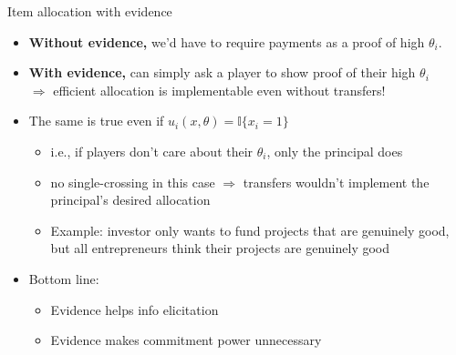 \documentclass[english,10pt
,aspectratio=169
]{beamer}
\begin{document}
\begin{frame}{Item allocation with evidence}
\begin{itemize}
	\item \textbf{Without evidence,} we'd have to require payments as a proof of high $\theta_i$.
	\item \textbf{With evidence,} can simply ask a player to show proof of their high $\theta_i$ 
	\\ $\Rightarrow$ efficient allocation is implementable even without transfers!
	\item The same is true even if \alert{$u_i(x,\theta) = \mathbb{I}\{x_i=1\}$}
	\begin{itemize}
		\item i.e., if players don't care about their $\theta_i$, only the principal does
		\item no single-crossing in this case $\Rightarrow$ transfers wouldn't implement the principal's desired allocation
		\item Example: investor only wants to fund projects that are genuinely good, but all entrepreneurs think their projects are genuinely good
	\end{itemize}
	\pause \bigskip 
	\item Bottom line: 
	\begin{itemize}
		\item Evidence helps info elicitation
		\item Evidence makes commitment power unnecessary
	\end{itemize}
\end{itemize}
\end{frame}
\end{document}
